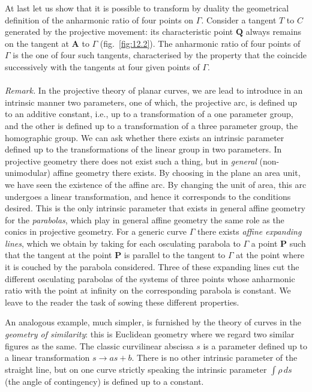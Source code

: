 \documentclass[leqno,11pt]{book}
\numberwithin{equation}{chapter}
\theoremstyle{shape1}
\theoremstyle{shapesmall}
\begin{document}
At last let us show that it is possible to transform by duality the geometrical definition of the anharmonic ratio of four points on $\Gamma$. Consider a tangent $T$ to $C$ generated by the projective movement: its characteristic point $\mathbf{Q}$ always remains on the tangent at $\mathbf{A}$ to $\Gamma$ (fig.~\ref{fig:12.2}). The anharmonic ratio of four points of $\Gamma$ is the one of four such tangents, characterised by the property that the coincide successively with the tangents at four given points of $\Gamma$.


\paragraph{}
\label{sec:184}
\emph{Remark.} In the projective theory of planar curves, we are lead to introduce in an intrinsic manner two parameters, one of which, the projective arc, is defined up to an additive constant, i.e., up to a transformation of a one parameter group, and the other is defined up to a transformation of a three parameter group, the homographic group. We can ask whether there exists an intrinsic parameter defined up to the transformations of the linear group in two parameters. In projective geometry there does not exist such a thing, but in \emph{general} (non-unimodular) affine geometry there exists. By choosing in the plane an area unit, we have seen the existence of the affine arc. By changing the unit of area, this arc undergoes a linear transformation, and hence it corresponds to the conditions desired. This is the only intrinsic parameter that exists in general affine geometry for the \emph{parabolas}, which play in general affine geometry the same role as the conics in projective geometry. For a generic curve $\Gamma$ there exists \emph{affine expanding lines}, which we obtain by taking for each osculating parabola to $\Gamma$ a point $\mathbf{P}$ such that the tangent at the point $\mathbf{P}$ is parallel to the tangent to $\Gamma$ at the point where it is couched by the parabola considered. Three of these expanding lines cut the different osculating parabolas of the systems of three points whose anharmonic ratio with the point at infinity on the corresponding parabola is constant. We leave to the reader the task of sowing these different properties.

An analogous example, much simpler, is furnished by the theory of curves in the \emph{geometry of similarity}: this is Euclidean geometry where we regard two similar figures as the same. The classic curvilinear abscissa $s$ is a parameter defined up to a linear transformation $s\rightarrow as+b$. There is no other intrinsic parameter of the straight line, but on one curve strictly speaking the intrinsic parameter $\int\rho\,ds$ (the angle of contingency) is defined up to a constant.
\end{document}
